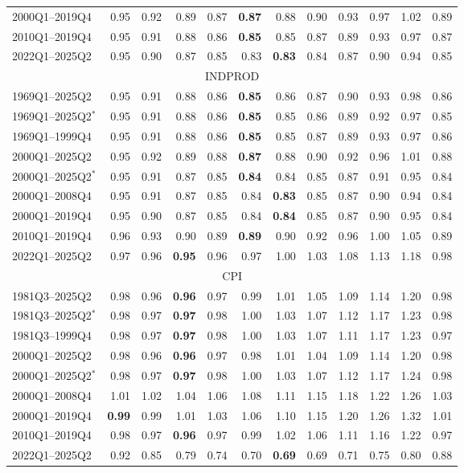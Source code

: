 \begin{tabular}{lrrrrrrrrrrr}
2000Q1--2019Q4 & 0.95 & 0.92 & 0.89 & 0.87 & \textbf{0.87} & 0.88 & 0.90 & 0.93 & 0.97 & 1.02 & 0.89 \\
2010Q1--2019Q4 & 0.95 & 0.91 & 0.88 & 0.86 & \textbf{0.85} & 0.85 & 0.87 & 0.89 & 0.93 & 0.97 & 0.87 \\
2022Q1--2025Q2 & 0.95 & 0.90 & 0.87 & 0.85 & 0.83 & \textbf{0.83} & 0.84 & 0.87 & 0.90 & 0.94 & 0.85 \\
\hline
\multicolumn{12}{c}{INDPROD} \\
1969Q1--2025Q2 & 0.95 & 0.91 & 0.88 & 0.86 & \textbf{0.85} & 0.86 & 0.87 & 0.90 & 0.93 & 0.98 & 0.86 \\
1969Q1--2025Q2$^*$ & 0.95 & 0.91 & 0.88 & 0.86 & \textbf{0.85} & 0.85 & 0.86 & 0.89 & 0.92 & 0.97 & 0.85 \\
1969Q1--1999Q4 & 0.95 & 0.91 & 0.88 & 0.86 & \textbf{0.85} & 0.85 & 0.87 & 0.89 & 0.93 & 0.97 & 0.86 \\
2000Q1--2025Q2 & 0.95 & 0.92 & 0.89 & 0.88 & \textbf{0.87} & 0.88 & 0.90 & 0.92 & 0.96 & 1.01 & 0.88 \\
2000Q1--2025Q2$^*$ & 0.95 & 0.91 & 0.87 & 0.85 & \textbf{0.84} & 0.84 & 0.85 & 0.87 & 0.91 & 0.95 & 0.84 \\
2000Q1--2008Q4 & 0.95 & 0.91 & 0.87 & 0.85 & 0.84 & \textbf{0.83} & 0.85 & 0.87 & 0.90 & 0.94 & 0.84 \\
2000Q1--2019Q4 & 0.95 & 0.90 & 0.87 & 0.85 & 0.84 & \textbf{0.84} & 0.85 & 0.87 & 0.90 & 0.95 & 0.84 \\
2010Q1--2019Q4 & 0.96 & 0.93 & 0.90 & 0.89 & \textbf{0.89} & 0.90 & 0.92 & 0.96 & 1.00 & 1.05 & 0.89 \\
2022Q1--2025Q2 & 0.97 & 0.96 & \textbf{0.95} & 0.96 & 0.97 & 1.00 & 1.03 & 1.08 & 1.13 & 1.18 & 0.98 \\
\hline
\multicolumn{12}{c}{CPI} \\
1981Q3--2025Q2 & 0.98 & 0.96 & \textbf{0.96} & 0.97 & 0.99 & 1.01 & 1.05 & 1.09 & 1.14 & 1.20 & 0.98 \\
1981Q3--2025Q2$^*$ & 0.98 & 0.97 & \textbf{0.97} & 0.98 & 1.00 & 1.03 & 1.07 & 1.12 & 1.17 & 1.23 & 0.98 \\
1981Q3--1999Q4 & 0.98 & 0.97 & \textbf{0.97} & 0.98 & 1.00 & 1.03 & 1.07 & 1.11 & 1.17 & 1.23 & 0.97 \\
2000Q1--2025Q2 & 0.98 & 0.96 & \textbf{0.96} & 0.97 & 0.98 & 1.01 & 1.04 & 1.09 & 1.14 & 1.20 & 0.98 \\
2000Q1--2025Q2$^*$ & 0.98 & 0.97 & \textbf{0.97} & 0.98 & 1.00 & 1.03 & 1.07 & 1.12 & 1.17 & 1.24 & 0.98 \\
2000Q1--2008Q4 & 1.01 & 1.02 & 1.04 & 1.06 & 1.08 & 1.11 & 1.15 & 1.18 & 1.22 & 1.26 & 1.03 \\
2000Q1--2019Q4 & \textbf{0.99} & 0.99 & 1.01 & 1.03 & 1.06 & 1.10 & 1.15 & 1.20 & 1.26 & 1.32 & 1.01 \\
2010Q1--2019Q4 & 0.98 & 0.97 & \textbf{0.96} & 0.97 & 0.99 & 1.02 & 1.06 & 1.11 & 1.16 & 1.22 & 0.97 \\
2022Q1--2025Q2 & 0.92 & 0.85 & 0.79 & 0.74 & 0.70 & \textbf{0.69} & 0.69 & 0.71 & 0.75 & 0.80 & 0.88 \\
\hline
\end{tabular}
